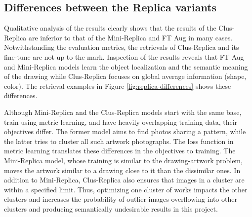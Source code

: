 \subsection{Differences between the Replica variants}

Qualitative analysis of the results clearly shows that the results of the Clus-Replica are inferior to that of the Mini-Replica and FT Aug in many cases. Notwithstanding the evaluation metrics, the retrievals of Clus-Replica and its fine-tune are not up to the mark. Inspection of the results reveals that FT Aug and Mini-Replica models learn the object localization and the semantic meaning of the drawing while Clus-Replica focuses on global average information (shape, color). The retrieval examples in Figure \ref{fig:replica-differences} shows these differences.

Although Mini-Replica and the Clus-Replica models start with the same base, train using metric learning, and have heavily overlapping training data, their objectives differ. The former model aims to find photos sharing a pattern, while the latter tries to cluster all such artwork photographs. The loss function in metric learning translates these differences in the objectives to training. The Mini-Replica model, whose training is similar to the drawing-artwork problem, moves the artwork similar to a drawing close to it than the dissimilar ones. In addition to Mini-Replica, Clus-Replica also ensures that images in a cluster are within a specified limit. Thus, optimizing one cluster of works impacts the other clusters and increases the probability of outlier images overflowing into other clusters and producing semantically undesirable results in this project.



